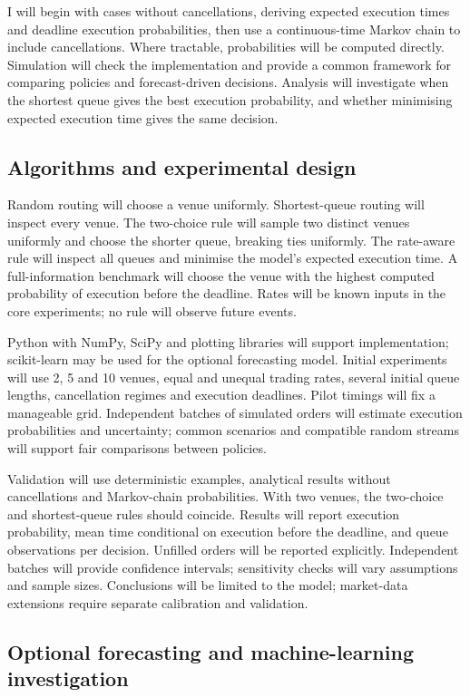 \documentclass[10pt,a4paper,oneside]{article}
\begin{document}
I will begin with cases without cancellations, deriving expected execution times and deadline execution probabilities, then use a continuous-time Markov chain to include cancellations. Where tractable, probabilities will be computed directly. Simulation will check the implementation and provide a common framework for comparing policies and forecast-driven decisions. Analysis will investigate when the shortest queue gives the best execution probability, and whether minimising expected execution time gives the same decision.

\subsection*{Algorithms and experimental design}

Random routing will choose a venue uniformly. Shortest-queue routing will inspect every venue. The two-choice rule will sample two distinct venues uniformly and choose the shorter queue, breaking ties uniformly. The rate-aware rule will inspect all queues and minimise the model's expected execution time. A full-information benchmark will choose the venue with the highest computed probability of execution before the deadline. Rates will be known inputs in the core experiments; no rule will observe future events.

Python with NumPy, SciPy and plotting libraries will support implementation; scikit-learn may be used for the optional forecasting model. Initial experiments will use 2, 5 and 10 venues, equal and unequal trading rates, several initial queue lengths, cancellation regimes and execution deadlines. Pilot timings will fix a manageable grid. Independent batches of simulated orders will estimate execution probabilities and uncertainty; common scenarios and compatible random streams will support fair comparisons between policies.

Validation will use deterministic examples, analytical results without cancellations and Markov-chain probabilities. With two venues, the two-choice and shortest-queue rules should coincide. Results will report execution probability, mean time conditional on execution before the deadline, and queue observations per decision. Unfilled orders will be reported explicitly. Independent batches will provide confidence intervals; sensitivity checks will vary assumptions and sample sizes. Conclusions will be limited to the model; market-data extensions require separate calibration and validation.

\subsection*{Optional forecasting and machine-learning investigation}
\end{document}
